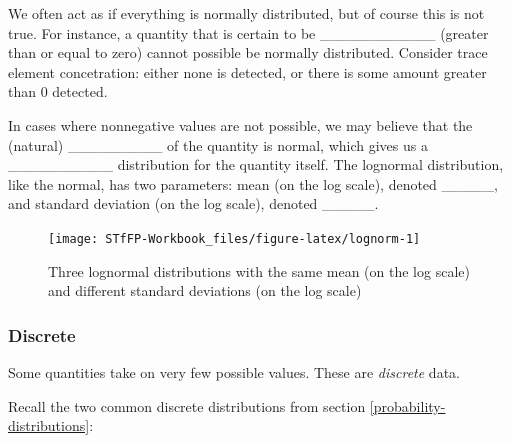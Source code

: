 \documentclass[]{book}
\theoremstyle{definition}
\theoremstyle{definition}
\theoremstyle{remark}
\begin{document}
We often act as if everything is normally distributed, but of course
this is not true. For instance, a quantity that is certain to be
\_\_\_\_\_\_\_\_\_\_\_ (greater than or equal to zero) cannot possible
be normally distributed. Consider trace element concetration: either
none is detected, or there is some amount greater than 0 detected.

In cases where nonnegative values are not possible, we may believe that
the (natural) \_\_\_\_\_\_\_\_\_ of the quantity is normal, which gives
us a \_\_\_\_\_\_\_\_\_\_ distribution for the quantity itself. The
lognormal distribution, like the normal, has two parameters: mean (on
the log scale), denoted \_\_\_\_\_, and standard deviation (on the log
scale), denoted \_\_\_\_\_.

\begin{figure}[h]

{\centering \texttt{[image: STfFP-Workbook\_files/figure-latex/lognorm-1]} 

}

\caption{Three lognormal distributions with the same mean (on the log scale) and different standard deviations (on the log scale)}\label{fig:lognorm}
\end{figure}

\subsubsection{Discrete}\label{discrete}

Some quantities take on very few possible values. These are
\emph{discrete} data.

Recall the two common discrete distributions from section
\ref{probability-distributions}:
\end{document}
